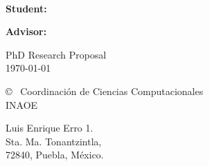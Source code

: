 \begin{titlepage}
    \begin{center}
        \mbox{ }\par
        \vspace{2.5cm}
        {\huge\bfseries\titulo\par}
        {\Large \textbf{Student:} \nombre \par \textbf{Advisor:} \tutorA \par}
        \vspace{3cm}
        {\Large  PhD Research Proposal\\
		\today \par}
        \vspace{5cm}
        {\Large \copyright~ Coordinaci\'on de Ciencias Computacionales\\
        INAOE\par}
       \vspace{2cm}
    \end{center}
    \begin{center}
    		{\Large
        Luis Enrique Erro 1. \\ Sta. Ma. Tonantzintla, \\ 72840, Puebla, M\'exico. \par}
    \end{center}
    


\end{titlepage}

\addtolength{\hoffset}{0.5cm}
\addtolength{\voffset}{2.0cm}
\addtolength{\oddsidemargin}{-3.0cm}  